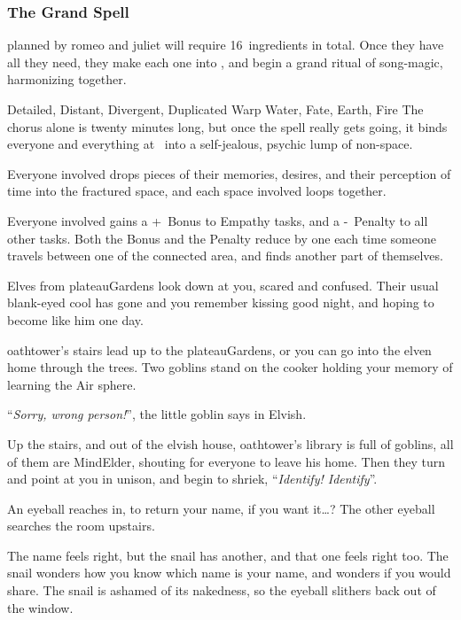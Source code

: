 \begin{multicols}{2}
\subsubsection{The Grand Spell}
\label{grandSpell}
planned by \gls{romeo} and \gls{juliet} will require 16~\glspl{ingredient} in total.
Once they have all they need, they make each one into , and begin a grand ritual of song-magic, harmonizing together.

  {Detailed, Distant, Divergent, Duplicated}%
  {Warp}%
  {Water, Fate, Earth, Fire}%
  {}%
  {The chorus alone is twenty minutes long, but once the spell really gets going, it binds everyone and everything at \spellRange\ into a self-jealous, psychic lump of non-space.}%
  {Everyone involved drops pieces of their memories, desires, and their perception of time into the fractured space, and each space involved loops together.

  Everyone involved gains a +~Bonus to Empathy tasks, and a -~Penalty to all other tasks.
  Both the Bonus and the Penalty reduce by one each time someone travels between one of the connected area, and finds another part of themselves.}

\begin{boxtext}
  Elves from \gls{plateauGardens} look down at you, scared and confused.
  Their usual blank-eyed cool has gone and you remember kissing  good night, and hoping to become like him one day.

  \Gls{oathtower}'s stairs lead up to the \gls{plateauGardens}, or you can go into the elven home through the trees.
  Two goblins stand on the cooker holding your memory of learning the Air \gls{sphere}.

    ``\textit{Sorry, wrong person!}'', the little goblin says in Elvish.

    Up the stairs, and out of the elvish house, \gls{oathtower}'s library is full of goblins, all of them are \gls{MindElder}, shouting for everyone to leave his home.
    Then they turn and point at you in unison, and begin to shriek, ``\textit{Identify! Identify}''.

    An eyeball reaches in, to return your name, if you want it\ldots ?
    The other eyeball searches the room upstairs.

    The name feels right, but the snail has another, and that one feels right too.
    The snail wonders how you know which name is your name, and wonders if you would share.
    The snail is ashamed of its nakedness, so the eyeball slithers back out of the window.


\end{boxtext}
\end{multicols}
